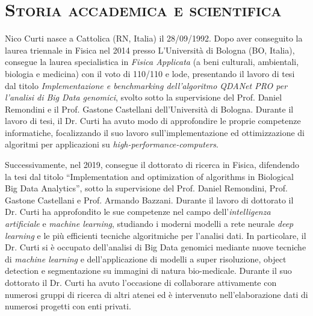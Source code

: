 \documentclass[a4paper,11pt]{article}
\newcommand{\quotes}[1]{``#1''}
\begin{document}
\maketitle

\section*{\scshape{Storia accademica e scientifica}}

\justifying

Nico Curti nasce a Cattolica (RN, Italia) il 28/09/1992.
Dopo aver conseguito la laurea triennale in Fisica nel 2014 presso L'Università di Bologna (BO, Italia), consegue la laurea specialistica in \emph{Fisica Applicata} (a beni culturali, ambientali, biologia e medicina) con il voto di 110/110 e lode, presentando il lavoro di tesi dal titolo \emph{Implementazione e benchmarking dell'algoritmo QDANet PRO per l'analisi di Big Data genomici}, svolto sotto la supervisione del Prof. Daniel Remondini e il Prof. Gastone Castellani dell'Università di Bologna.
Durante il lavoro di tesi, il Dr. Curti ha avuto modo di approfondire le proprie competenze informatiche, focalizzando il suo lavoro sull'implementazione ed ottimizzazione di algoritmi per applicazioni su \emph{high-performance-computers}.

Successivamente, nel 2019, consegue il dottorato di ricerca in Fisica, difendendo la tesi dal titolo \quotes{Implementation and optimization of algorithms in Biological Big Data Analytics}, sotto la supervisione del Prof. Daniel Remondini, Prof. Gastone Castellani e Prof. Armando Bazzani.
Durante il lavoro di dottorato il Dr. Curti ha approfondito le sue competenze nel campo dell'\emph{intelligenza artificiale} e \emph{machine learning}, studiando i moderni modelli a rete neurale \emph{deep learning} e le più efficienti tecniche algoritmiche per l'analisi dati.
In particolare, il Dr. Curti si è occupato dell'analisi di Big Data genomici mediante nuove tecniche di \emph{machine learning} e dell'applicazione di modelli a super risoluzione, object detection e segmentazione su immagini di natura bio-medicale.
Durante il suo dottorato il Dr. Curti ha avuto l'occasione di collaborare attivamente con numerosi gruppi di ricerca di altri atenei ed è intervenuto nell'elaborazione dati di numerosi progetti con enti privati.
\end{document}
